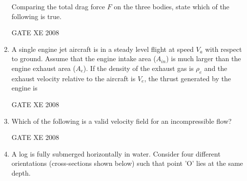 \documentclass[12pt]{article}
\begin{document}
\begin{enumerate}[label=Q\arabic*.]
Comparing the total drag force $F$ on the three bodies, state which of the following is true.

\begin{enumerate}[label=(\Alph*)]
\end{enumerate}

GATE XE 2008
\item A single engine jet aircraft is in a steady level flight at speed $V_a$ with respect to ground. Assume that the engine intake area ($A_{in}$) is much larger than the engine exhaust area ($A_e$). If the density of the exhaust gas is $\rho _e$ and the exhaust velocity relative to the aircraft is $V_e$, the thrust generated by
the engine is

\begin{enumerate}[label=(\Alph*)]
\end{enumerate}

GATE XE 2008
\item Which of the following is a valid velocity field for an incompressible flow?

\begin{enumerate}[label=(\Alph*)]
\end{enumerate}

GATE XE 2008
\item A log is fully submerged horizontally in water. Consider four different orientations (cross-sections shown below) such that point 'O' lies at the same depth.


\end{enumerate}
\end{document}

